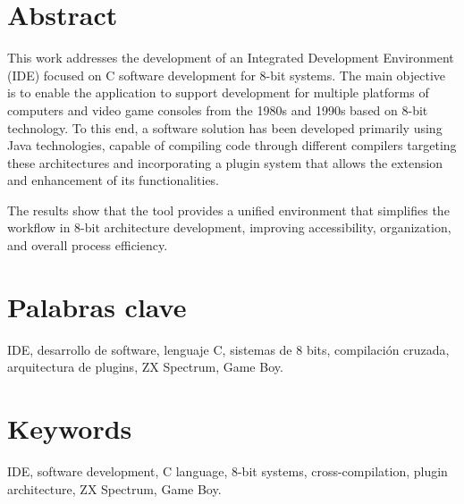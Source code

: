\documentclass[12pt,twoside]{book}
\begin{document}
\chapter*{Abstract} %

This work addresses the development of an Integrated Development Environment (IDE) focused on C software development for 8-bit systems. The main objective is to enable the application to support development for multiple platforms of computers and video game consoles from the 1980s and 1990s based on 8-bit technology. To this end, a software solution has been developed primarily using Java technologies, capable of compiling code through different compilers targeting these architectures and incorporating a plugin system that allows the extension and enhancement of its functionalities.

The results show that the tool provides a unified environment that simplifies the workflow in 8-bit architecture development, improving accessibility, organization, and overall process efficiency.

\chapter*{Palabras clave} %

IDE, desarrollo de software, lenguaje C, sistemas de 8 bits, compilación cruzada, arquitectura de plugins, ZX Spectrum, Game Boy.

\chapter*{Keywords} %

IDE, software development, C language, 8-bit systems, cross-compilation, plugin architecture, ZX Spectrum, Game Boy.

\tableofcontents %

\listoftables    %
    
\listoffigures   %
\newpage
\end{document}
